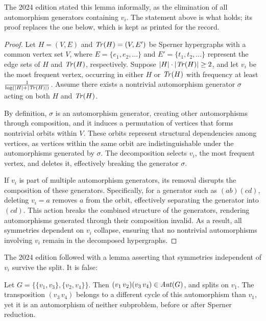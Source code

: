 The 2024 edition stated this lemma informally, as the elimination of all automorphism generators containing $v_i$. The statement above is what holds; its proof replaces the one below, which is kept as printed for the record.

\begin{proof}
Let $H=(V,E)$ and $\mathit{Tr}(H)=(V,E')$ be Sperner hypergraphs with a common vertex set $V$, where $E=\{e_1,e_2,\dots\}$ and $E'=\{t_1,t_2,\dots\}$ represent the edge sets of $H$ and $\mathit{Tr}(H)$, respectively. Suppose $|H|\cdot|\mathit{Tr}(H)|\geq 2$, and let $v_i$ be the most frequent vertex, occurring in either $H$ or $\mathit{Tr}(H)$ with frequency at least $\frac{1}{\log(|H|+|\mathit{Tr}(H)|)}$. Assume there exists a nontrivial automorphism generator $\sigma$ acting on both $H$ and $\mathit{Tr}(H)$.

By definition, $\sigma$ is an automorphism generator, creating other automorphisms through composition, and it induces a permutation of vertices that forms nontrivial orbits within $V$. These orbits represent structural dependencies among vertices, as vertices within the same orbit are indistinguishable under the automorphisms generated by $\sigma$. The \FKA{} decomposition selects $v_i$, the most frequent vertex, and deletes it, effectively breaking the generator $\sigma$.

If $v_i$ is part of multiple automorphism generators, its removal disrupts the composition of these generators. Specifically, for a generator such as $(ab)(cd)$, deleting $v_i=a$ removes $a$ from the orbit, effectively separating the generator into $(cd)$. This action breaks the combined structure of the generators, rendering automorphisms generated through their composition invalid. As a result, all symmetries dependent on $v_i$ collapse, ensuring that no nontrivial automorphisms involving $v_i$ remain in the decomposed hypergraphs.
\end{proof}

The 2024 edition followed with a lemma asserting that symmetries independent of $v_i$ survive the split. It is false:

\begin{example}
Let $G=\{\{v_1,v_3\},\{v_2,v_4\}\}$. Then $(v_1\,v_2)(v_3\,v_4)\in\mathit{Aut}(G)$, and \FKA{} splits on $v_1$. The transposition $(v_3\,v_4)$ belongs to a different cycle of this automorphism than $v_1$, yet it is an automorphism of neither subproblem, before or after Sperner reduction.
\end{example}

